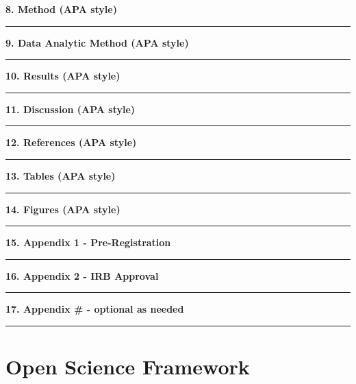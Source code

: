 \documentclass[openany]{book}
\begin{document}
\textbf{8. Method (APA style)}

\begin{center}\rule{0.5\linewidth}{0.5pt}\end{center}

\textbf{9. Data Analytic Method (APA style)}

\begin{center}\rule{0.5\linewidth}{0.5pt}\end{center}

\textbf{10. Results (APA style)}

\begin{center}\rule{0.5\linewidth}{0.5pt}\end{center}

\textbf{11. Discussion (APA style)}

\begin{center}\rule{0.5\linewidth}{0.5pt}\end{center}

\textbf{12. References (APA style)}

\begin{center}\rule{0.5\linewidth}{0.5pt}\end{center}

\textbf{13. Tables (APA style)}

\begin{center}\rule{0.5\linewidth}{0.5pt}\end{center}

\textbf{14. Figures (APA style)}

\begin{center}\rule{0.5\linewidth}{0.5pt}\end{center}

\textbf{15. Appendix 1 - Pre-Registration}

\begin{center}\rule{0.5\linewidth}{0.5pt}\end{center}

\textbf{16. Appendix 2 - IRB Approval}

\begin{center}\rule{0.5\linewidth}{0.5pt}\end{center}

\textbf{17. Appendix \# - optional as needed}

\begin{center}\rule{0.5\linewidth}{0.5pt}\end{center}

\hypertarget{open-science-framework}{%
\chapter{Open Science Framework}\label{open-science-framework}}
\end{document}
